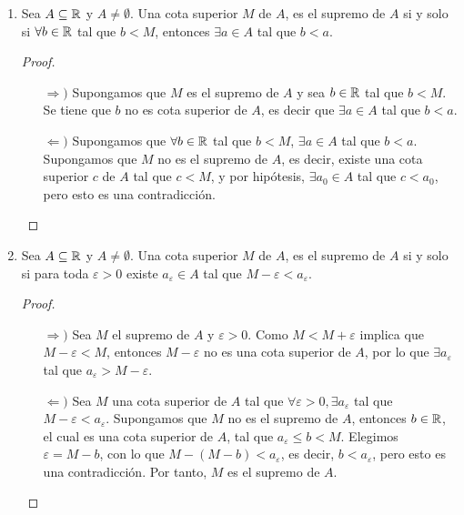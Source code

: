 \begin{enumerate}[label=\alph*)]
\begin{proof}
    Sea $L\coloneqq \sup{(\N)}$. Como $L-1$ no es cota superior de $\N$, ya que $L>L-1$ y $L$ es la cota superior más pequeña, existe un núero natural $n_0$ tal que $n_0>L-1$, lo cual implica que $n_0+1<L$, pero esto contradice la hipótesis	de que $L$ es supremo de $\N$. Por tanto, el conjunto de los números naturales no está acotado superiormente.
  \end{proof}
  
 \item Sea $A\subseteq \mathbb{R}$ y $A\neq \emptyset$. Una cota superior $M$ de $A$, es el supremo de $A$ si y solo si $\forall b\in \mathbb{R}$ tal que $b<M$, entonces $\exists a\in A$ tal que $b<a$.
 \begin{proof}\leavevmode
 \begin{itemize}
 \item[$\Rightarrow)$] Supongamos que $M$ es el supremo de $A$ y sea $b\in \mathbb{R}$ tal que $b<M$. Se tiene que $b$ no es cota superior de $A$, es decir que $\exists a\in A$ tal que $b<a$.
 \item[$\Leftarrow)$] Supongamos que $\forall b\in \mathbb{R}$ tal que $b<M$, $\exists a\in A$ tal que $b<a$. Supongamos que $M$ no es el supremo de $A$, es decir, existe una cota superior $c$ de $A$ tal que $c<M$, y por hipótesis, $\exists a_0\in A$ tal que $c<a_0$, pero esto es una contradicción. \qedhere
 \end{itemize}
 \end{proof}

 \item Sea $A\subseteq \mathbb{R}$ y $A\neq \emptyset$. Una cota superior $M$ de $A$, es el supremo de $A$ si y solo si para toda $\varepsilon>0$ existe $a_\varepsilon \in A$ tal que $M-\varepsilon<a_\varepsilon$.

  \begin{proof}\leavevmode
  \begin{itemize}
  \item[$\Rightarrow)$] Sea $M$ el supremo de $A$ y $\varepsilon>0$. Como $M<M+\varepsilon$ implica que $M-\varepsilon<M$, entonces $M-\varepsilon$ no es una cota superior de $A$, por lo que $\exists a_\varepsilon$ tal que $a_\varepsilon>M-\varepsilon$.
  \item[$\Leftarrow)$] Sea $M$ una cota superior de $A$ tal que $\forall \varepsilon>0, \exists a_{\varepsilon}$ tal que $M-\varepsilon<a_{\varepsilon}$. Supongamos que $M$ no es el supremo de $A$, entonces $b\in \mathbb{R}$, el cual es una cota superior de $A$, tal que $a_\varepsilon \leq b < M$. Elegimos $\varepsilon = M-b$, con lo que $M-(M-b)<a_\varepsilon$, es decir, $b<a_{\varepsilon}$, pero esto es una contradicción. Por tanto, $M$ es el supremo de $A$. \qedhere
  \end{itemize}
  \end{proof}
  

\end{enumerate}

